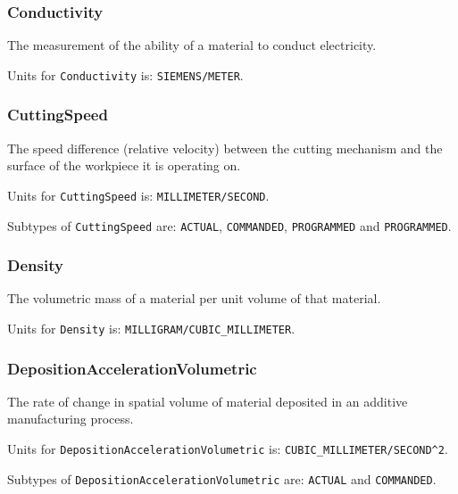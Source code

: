 \FloatBarrier

\subsubsection{Conductivity}
  \label{sec:Conductivity}



The measurement of the ability of a material to conduct electricity.


Units for \texttt{Conductivity} is: \texttt{SIEMENS/METER}.

\FloatBarrier

\subsubsection{CuttingSpeed}
  \label{sec:CuttingSpeed}



The speed difference (relative velocity) between the cutting mechanism and the surface of the workpiece it is operating on.


Units for \texttt{CuttingSpeed} is: \texttt{MILLIMETER/SECOND}.


Subtypes of \texttt{CuttingSpeed} are: \texttt{ACTUAL}, \texttt{COMMANDED}, \texttt{PROGRAMMED} and \texttt{PROGRAMMED}. 
\FloatBarrier

\subsubsection{Density}
  \label{sec:Density}



The volumetric mass of a material per unit volume of that material.


Units for \texttt{Density} is: \texttt{MILLIGRAM/CUBIC_MILLIMETER}.

\FloatBarrier

\subsubsection{DepositionAccelerationVolumetric}
  \label{sec:DepositionAccelerationVolumetric}



The rate of change in spatial volume of material deposited in an additive manufacturing process.


Units for \texttt{DepositionAccelerationVolumetric} is: \texttt{CUBIC_MILLIMETER/SECOND\^{}2}.


Subtypes of \texttt{DepositionAccelerationVolumetric} are: \texttt{ACTUAL} and \texttt{COMMANDED}. 
\FloatBarrier

